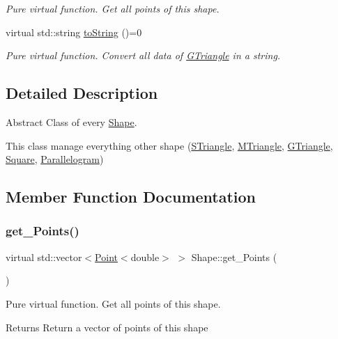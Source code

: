 \begin{DoxyCompactItemize}
\begin{DoxyCompactList}\small\item\em Pure virtual function. Get all points of this shape. \end{DoxyCompactList}\item 
virtual std\+::string \hyperlink{classShape_a98fa87c6dc4c7045fd6897a8f3bc186c}{to\+String} ()=0
\begin{DoxyCompactList}\small\item\em Pure virtual function. Convert all data of \hyperlink{classGTriangle}{G\+Triangle} in a string. \end{DoxyCompactList}\end{DoxyCompactItemize}


\subsection{Detailed Description}
Abstract Class of every \hyperlink{classShape}{Shape}. 

This class manage everything other shape (\hyperlink{classSTriangle}{S\+Triangle}, \hyperlink{classMTriangle}{M\+Triangle}, \hyperlink{classGTriangle}{G\+Triangle}, \hyperlink{classSquare}{Square}, \hyperlink{classParallelogram}{Parallelogram}) 

\subsection{Member Function Documentation}
\mbox{\label{classShape_add74a5c682840fa4a519242b1ddbd0b5}} 
\subsubsection{\texorpdfstring{get\+\_\+\+Points()}{get\_Points()}}
{\footnotesize\ttfamily virtual std\+::vector$<$\hyperlink{classPoint}{Point}$<$double$>$ $>$ Shape\+::get\+\_\+\+Points (\begin{DoxyParamCaption}{ }\end{DoxyParamCaption})\hspace{0.3cm}{\ttfamily [pure virtual]}}



Pure virtual function. Get all points of this shape. 

\begin{DoxyReturn}{Returns}
Return a vector of points of this shape 
\end{DoxyReturn}


